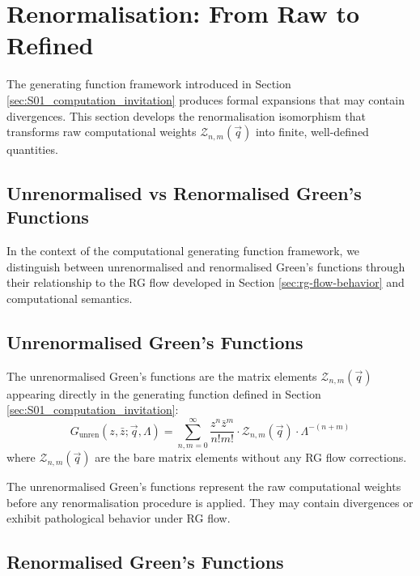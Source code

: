 
\section{Renormalisation: From Raw to Refined}
\label{sec:renormalisation}

The generating function framework introduced in Section \ref{sec:S01_computation_invitation} produces formal expansions that may contain divergences. This section develops the renormalisation isomorphism that transforms raw computational weights $\mathcal{Z}_{n,m}(\vec{q})$ into finite, well-defined quantities.

\subsection{Unrenormalised vs Renormalised Green's Functions}

In the context of the computational generating function framework, we distinguish between unrenormalised and renormalised Green's functions through their relationship to the RG flow developed in Section \ref{sec:rg-flow-behavior} and computational semantics.

\subsection{Unrenormalised Green's Functions}

\begin{definition}
\label{def:unrenormalised-greens}
The unrenormalised Green's functions are the matrix elements $\mathcal{Z}_{n,m}(\vec{q})$ appearing directly in the generating function defined in Section \ref{sec:S01_computation_invitation}:
\[
G_{\text{unren}}(z, \bar{z}; \vec{q}, \Lambda) = \sum_{n,m=0}^{\infty} \frac{z^n \bar{z}^m}{n! m!} \cdot \mathcal{Z}_{n,m}(\vec{q}) \cdot \Lambda^{-(n+m)}
\]
where $\mathcal{Z}_{n,m}(\vec{q})$ are the bare matrix elements without any RG flow corrections.
\end{definition}

The unrenormalised Green's functions represent the raw computational weights before any renormalisation procedure is applied. They may contain divergences or exhibit pathological behavior under RG flow.

\subsection{Renormalised Green's Functions}

